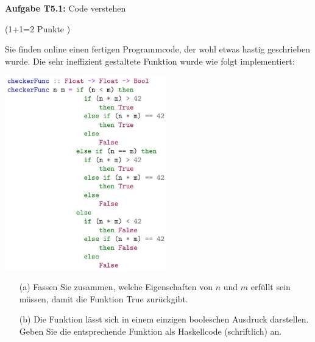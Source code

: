 \RequirePackage{fix-cm}


\newcommand{\obenlinks}{Übungen zur Vorlesung Informatik I}   %




\graphicspath{ {./images/} }

\textbf{Aufgabe T5.1:} Code verstehen

(1+1=2 Punkte )

Sie finden online einen fertigen Programmcode, der wohl etwas hastig geschrieben wurde. Die sehr ineffizient gestaltete Funktion 
wurde wie folgt implementiert:

\includegraphics[width=7cm]{2022_11_15_0a5a2eee0aef383b0ce9g-1}

\begin{itemize}
  \item [(a)] Fassen Sie zusammen, welche Eigenschaften von $n$ und $m$ erfüllt sein müssen, damit die Funktion True zurückgibt.

  \item [(b)] Die Funktion lässt sich in einem einzigen booleschen Ausdruck darstellen. Geben Sie die entsprechende Funktion als 
  Haskellcode (schriftlich) an.
  
\end{itemize}

